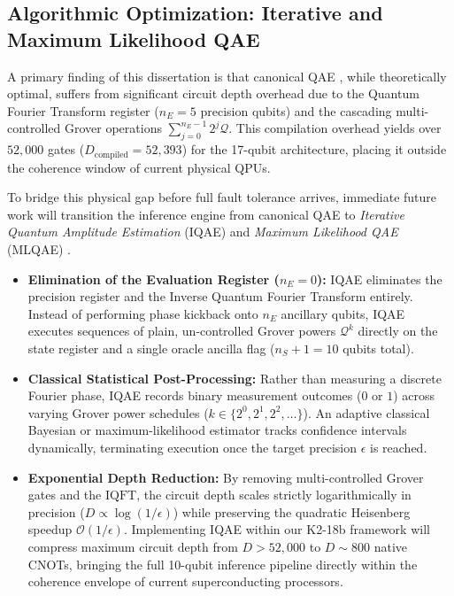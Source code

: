 \subsection{Algorithmic Optimization: Iterative and Maximum Likelihood QAE}\label{subsec:future_iqae}

A primary finding of this dissertation is that canonical QAE \cite{brassard2002}, while theoretically optimal, suffers from significant circuit depth overhead due to the Quantum Fourier Transform register ($n_E = 5$ precision qubits) and the cascading multi-controlled Grover operations $\sum_{j=0}^{n_E-1} 2^j \mathcal{Q}$. This compilation overhead yields over $52,000$ gates ($D_{\mathrm{compiled}} = 52,393$) for the 17-qubit architecture, placing it outside the coherence window of current physical QPUs.

To bridge this physical gap before full fault tolerance arrives, immediate future work will transition the inference engine from canonical QAE to \emph{Iterative Quantum Amplitude Estimation} (IQAE) \cite{grinko2021} and \emph{Maximum Likelihood QAE} (MLQAE) \cite{suzuki2020}. 
\begin{itemize}
    \item \textbf{Elimination of the Evaluation Register ($n_E = 0$):} IQAE eliminates the precision register and the Inverse Quantum Fourier Transform entirely. Instead of performing phase kickback onto $n_E$ ancillary qubits, IQAE executes sequences of plain, un-controlled Grover powers $\mathcal{Q}^k$ directly on the state register and a single oracle ancilla flag ($n_S + 1 = 10$ qubits total).
    \item \textbf{Classical Statistical Post-Processing:} Rather than measuring a discrete Fourier phase, IQAE records binary measurement outcomes ($0$ or $1$) across varying Grover power schedules ($k \in \{2^0, 2^1, 2^2, \dots\}$). An adaptive classical Bayesian or maximum-likelihood estimator tracks confidence intervals dynamically, terminating execution once the target precision $\epsilon$ is reached.
    \item \textbf{Exponential Depth Reduction:} By removing multi-controlled Grover gates and the $\mathrm{IQFT}$, the circuit depth scales strictly logarithmically in precision ($D \propto \log(1/\epsilon)$) while preserving the quadratic Heisenberg speedup $\mathcal{O}(1/\epsilon)$. Implementing IQAE within our K2-18b framework will compress maximum circuit depth from $D > 52,000$ to $D \sim 800$ native CNOTs, bringing the full 10-qubit inference pipeline directly within the coherence envelope of current superconducting processors.
\end{itemize}

